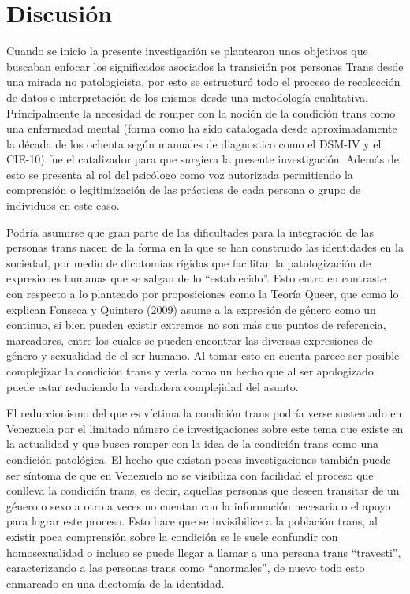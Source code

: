 \section{Discusión}\label{sec:discusion}

Cuando se inicio la presente investigación se plantearon unos objetivos que
buscaban enfocar los significados asociados la transición por personas Trans
desde una mirada no patologicista, por esto se estructuró todo el proceso de
recolección de datos e interpretación de los mismos desde una metodología
cualitativa. Principalmente la necesidad de romper con la noción de la condición
trans como una enfermedad mental (forma como ha sido catalogada desde
aproximadamente la década de los ochenta según manuales de diagnostico como el
DSM-IV y el CIE-10) fue el catalizador para que surgiera la presente
investigación. Además de esto se presenta al rol del psicólogo como voz
autorizada permitiendo la comprensión o legitimización de las prácticas de cada
persona o grupo de individuos en este caso.

Podría asumirse que gran parte de las dificultades para la integración de las
personas trans nacen de la forma en la que se han construido las identidades en
la sociedad, por medio de dicotomías rígidas que facilitan la patologización de
expresiones humanas que se salgan de lo “establecido”. Esto entra en contraste
con respecto a lo planteado por proposiciones como la Teoría Queer, que como lo
explican Fonseca y Quintero (2009) asume a la expresión de género como un
continuo, si bien pueden existir extremos no son más que puntos de referencia,
marcadores, entre los cuales se pueden encontrar las diversas expresiones de
género y sexualidad de el ser humano. Al tomar esto en cuenta parece ser posible
complejizar la condición trans y verla como un hecho que al ser apologizado
puede estar reduciendo la verdadera complejidad del asunto.

El reduccionismo del que es víctima la condición trans podría verse sustentado
en Venezuela por el limitado número de investigaciones sobre este tema que
existe en la actualidad y que busca romper con la idea de la condición trans
como una condición patológica. El hecho que existan pocas investigaciones
también puede ser síntoma de que en Venezuela no se visibiliza con facilidad el
proceso que conlleva la condición trans, es decir, aquellas personas que deseen
transitar de un género o sexo a otro a veces no cuentan con la información
necesaria o el apoyo para lograr este proceso. Esto hace que se invisibilice a
la población trans, al existir poca comprensión sobre la condición se le suele
confundir con homosexualidad o incluso se puede llegar a llamar a una persona
trans “travesti”, caracterizando a las personas trans como “anormales”, de nuevo
todo esto enmarcado en una dicotomía de la identidad.

